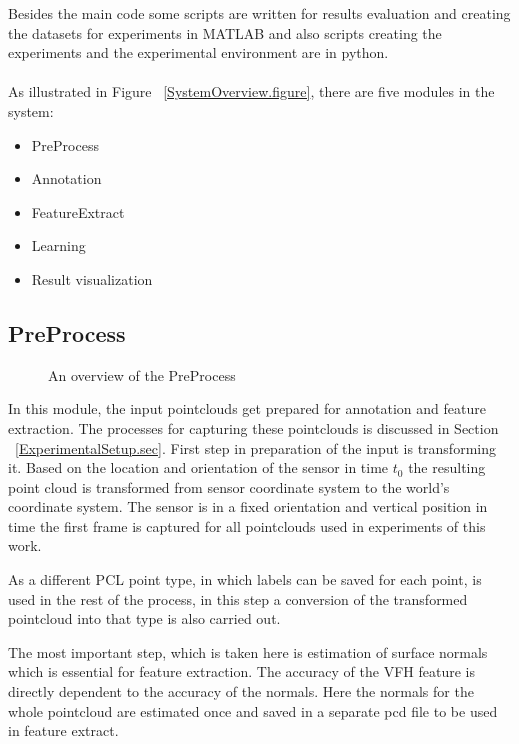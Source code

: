 Besides the main code some scripts are written for results evaluation and creating the datasets for experiments in MATLAB and also 
scripts creating the experiments and the experimental environment are in python.\\
\\
As illustrated in Figure ~\ref{SystemOverview.figure}, there are five modules in the system:

\begin{itemize}
  \item PreProcess
  \item Annotation
  \item FeatureExtract
  \item Learning
  \item Result visualization
\end{itemize}

\subsection{PreProcess}
\label{PreProcess.ssec}

\begin{figure}[t]
  \caption[PreProcess overview]
  {An overview of the PreProcess}
  \label{PreProcess.figure}
\end{figure}

 In this module, the input pointclouds get prepared for annotation and feature extraction. 
 The processes for capturing these pointclouds is discussed in Section ~\ref{ExperimentalSetup.sec}. 
 First step in preparation of the input is transforming it.
 Based on the location and orientation of the sensor in time $t_0$ the resulting point cloud is transformed from 
 sensor coordinate system to the world's coordinate system.
 The sensor is in a fixed orientation and vertical position in time the first frame is captured for all pointclouds 
 used in experiments of this work.
 
 As a different PCL point type, in which labels can be saved for each point, is used in the rest of the process, 
 in this step a conversion of the transformed pointcloud into that type  is also carried out.
 
 The most important step, which is taken here is estimation of surface normals which is essential for feature extraction. 
 The accuracy of the VFH feature is directly dependent to the accuracy of the normals. 
 Here the normals for the whole pointcloud are estimated once and saved in a separate pcd file to be used in 
 feature extract. 
 
